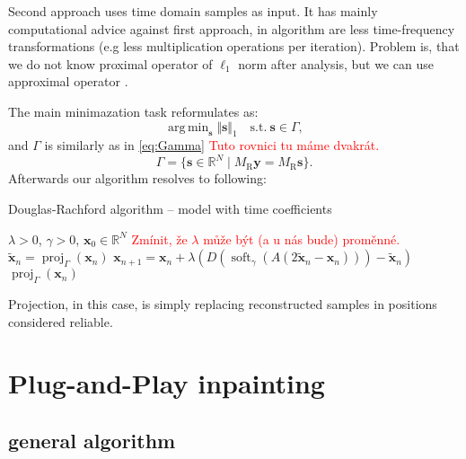 \documentclass[conference]{IEEEtran}
\newcommand{\todo}[1]{\textcolor{red}{#1}}
\begin{document}
Second approach uses time domain samples as input.
It has mainly computational advice against first approach, in algorithm are less time-frequency transformations (e.g less multiplication operations per iteration).
Problem is, 
that we do not know proximal operator of $ \ell_1 $ norm after analysis, but we can use approximal operator \cite{Mokry2021}.

The main minimazation task reformulates as:
\begin{equation}
	\mathop {\operatorname{arg \, min}}_\mathbf {s}\Vert \mathbf {s}\Vert _1 \quad \text{s.t.}\ \mathbf {s}\in \Gamma,
\end{equation} 
and $ \Gamma $ is similarly as in \eqref{eq:Gamma} %
\todo{Tuto rovnici tu máme dvakrát.}
\begin{equation}
	\Gamma = \lbrace \mathbf {s}\in \mathbb {R}^N\mid M_{\mathrm{R}}\mathbf {y}=M_{\mathrm{R}}\mathbf {s}\rbrace.
\end{equation}
Afterwards our algorithm resolves to following: 
\begin{algorithm}
	\caption{Douglas-Rachford algorithm -- model with time coefficients}
	\begin{algorithmic}[1]\label{alg:DRA_t}
		\renewcommand{\algorithmicrequire}{\textbf{Input:}}
		\renewcommand{\algorithmicensure}{\textbf{Output:}}
		\REQUIRE $ \lambda > 0 $, $ \gamma>0 $, $ \mathbf{x}_0 \in \mathbb{R}^{N} $ \todo{Zmínit, že $\lambda$ může být (a u nás bude) proměnné.}
		\STATE $\mathbf{\widetilde{x}}_n=\operatorname{proj}_{\Gamma}(\mathbf{x}_n) $ 
		\STATE $ \mathbf{x}_{n+1} = \mathbf{x}_n + \lambda \left( D\left(\operatorname{soft}_{\gamma}\left(A\left(2\mathbf{\widetilde{x}}_n-\mathbf{x}_n\right) \right)\right) -\mathbf{\widetilde{x}}_n\right)$
		\ENDFOR
		\RETURN $\operatorname{proj}_{\Gamma}(\mathbf{x}_n)$ 
	\end{algorithmic} 
\end{algorithm}

Projection, in this case, is simply replacing reconstructed samples in positions considered reliable.

\section{Plug-and-Play inpainting} \label{sec:plugaandplay}

\subsection{general algorithm}
\end{document}
